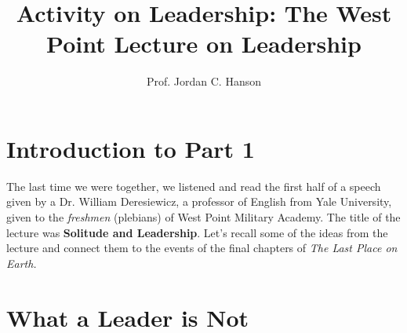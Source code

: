 \documentclass{article}
\begin{document}
\title{Activity on Leadership: The West Point Lecture on Leadership}
\author{Prof. Jordan C. Hanson}

\maketitle

\section{Introduction to Part 1}

The last time we were together, we listened and read the first half of a speech given by a Dr. William Deresiewicz, a professor of English from Yale University, given to the \textit{freshmen} (plebians) of West Point Military Academy.  The title of the lecture was \textbf{Solitude and Leadership}.  Let's recall some of the ideas from the lecture and connect them to the events of the final chapters of \textit{The Last Place on Earth.}

\section{What a Leader is Not}
\end{document}
